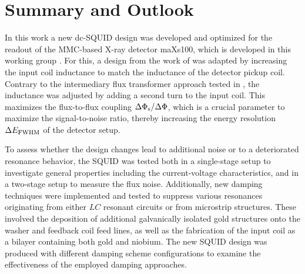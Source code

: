 \chapter{Summary and Outlook}

In this work a new dc-SQUID design was developed and optimized for the readout of the MMC-based X-ray detector maXs100, which is developed in this working group \cite{Allgeier2024}. For this, a design from the work of \cite{Bauer2022} was adapted by increasing the input coil inductance to match the inductance of the detector pickup coil. Contrary to the intermediary flux transformer approach tested in \cite{Bauer2022}, the inductance was adjusted by adding a second turn to the input coil. This maximizes the flux-to-flux coupling $\Delta\Phi_{\rm s}/\Delta\Phi$, which is a crucial parameter to maximize the signal-to-noise ratio, thereby increasing the energy resolution $\Delta E_{\rm FWHM}$ of the detector setup.

To assess whether the design changes lead to additional noise or to a deteriorated resonance behavior, the SQUID was tested both in a single-stage setup to investigate general properties including the current-voltage characteristics, and in a two-stage setup to measure the flux noise. Additionally, new damping techniques were implemented and tested to suppress various resonances originating from either $LC$ resonant circuits or from microstrip structures. These involved the deposition of additional galvanically isolated gold structures onto the washer and feedback coil feed lines, as well as the fabrication of the input coil as a bilayer containing both gold and niobium. The new SQUID design was produced with different damping scheme configurations to examine the effectiveness of the employed damping approaches. 

